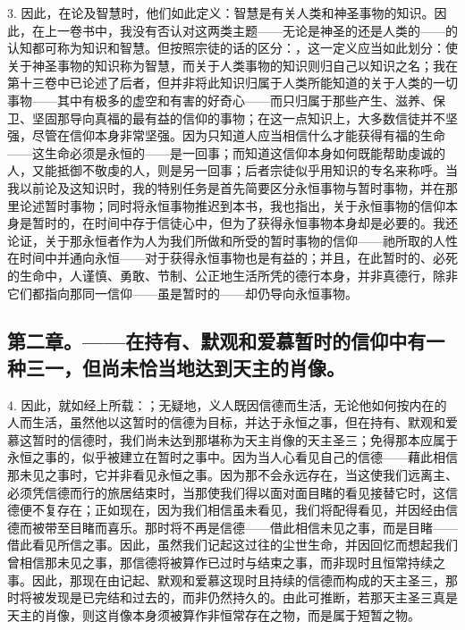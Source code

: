 3. 因此，在论及智慧时，他们如此定义：智慧是有关人类和神圣事物的知识。因此，在上一卷书中，我没有否认对这两类主题——无论是神圣的还是人类的——的认知都可称为知识和智慧。但按照宗徒的话的区分：，这一定义应当如此划分：使关于神圣事物的知识称为智慧，而关于人类事物的知识则归自己以知识之名；我在第十三卷中已论述了后者，但并非将此知识归属于人类所能知道的关于人类的一切事物——其中有极多的虚空和有害的好奇心——而只归属于那些产生、滋养、保卫、坚固那导向真福的最有益的信仰的事物；在这一点知识上，大多数信徒并不坚强，尽管在信仰本身非常坚强。因为只知道人应当相信什么才能获得有福的生命——这生命必须是永恒的——是一回事；而知道这信仰本身如何既能帮助虔诚的人，又能抵御不敬虔的人，则是另一回事；后者宗徒似乎用知识的专名来称呼。当我以前论及这知识时，我的特别任务是首先简要区分永恒事物与暂时事物，并在那里论述暂时事物；同时将永恒事物推迟到本书，我也指出，关于永恒事物的信仰本身是暂时的，在时间中存于信徒心中，但为了获得永恒事物本身却是必要的。我还论证，关于那永恒者作为人为我们所做和所受的暂时事物的信仰——祂所取的人性在时间中并通向永恒——对于获得永恒事物也是有益的；并且，在此暂时的、必死的生命中，人谨慎、勇敢、节制、公正地生活所凭的德行本身，并非真德行，除非它们都指向那同一信仰——虽是暂时的——却仍导向永恒事物。\par


\subsection{第二章。——在持有、默观和爱慕暂时的信仰中有一种三一，但尚未恰当地达到天主的肖像。}

4. 因此，就如经上所载：；无疑地，义人既因信德而生活，无论他如何按内在的人而生活，虽然他以这暂时的信德为目标，并达于永恒之事，但在持有、默观和爱慕这暂时的信德时，我们尚未达到那堪称为天主肖像的天主圣三；免得那本应属于永恒之事的，似乎被建立在暂时之事中。因为当人心看见自己的信德——藉此相信那未见之事时，它并非看见永恒之事。因为那不会永远存在，当这使我们远离主、必须凭信德而行的旅居结束时，当那使我们得以面对面目睹的看见接替它时，这信德便不复存在；正如现在，因为我们相信虽未看见，我们将配得看见，并因经由信德而被带至目睹而喜乐。那时将不再是信德——借此相信未见之事，而是目睹——借此看见所信之事。因此，虽然我们记起这过往的尘世生命，并因回忆而想起我们曾相信那未见之事，那信德将被算作已过时与结束之事，而非现时且恒常持续之事。因此，那现在由记起、默观和爱慕这现时且持续的信德而构成的天主圣三，那时将被发现是已完结和过去的，而非仍然持久的。由此可推断，若那天主圣三真是天主的肖像，则这肖像本身须被算作非恒常存在之物，而是属于短暂之物。\par

